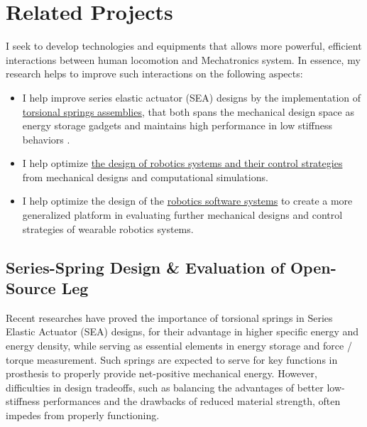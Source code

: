 \documentclass[8pt]{article}
\begin{document}

 

% 

\section{Related Projects}

I seek to develop technologies and equipments that allows more powerful, efficient interactions between human locomotion and Mechatronics system. In essence, my research helps to improve such interactions on the following aspects: 

\begin{itemize}

    \item {I help improve series elastic actuator (SEA) designs by the implementation of \hyperref[sec:series-spring]{torsional springs assemblies}, that both spans the mechanical design space as energy storage gadgets and maintains high performance in low stiffness behaviors \cite{SpringDesign_OSL}.}
    
    \item {I help optimize \hyperref[sec:RobotSwimmer]{the design of robotics systems and their control strategies} from mechanical designs and computational simulations.}
    
    \item {I help optimize the design of the \hyperref[sec:OSL-Library]{robotics software systems} to create a more generalized platform in evaluating further mechanical designs and control strategies of wearable robotics systems.}

\end{itemize}


    \subsection{Series-Spring Design \& Evaluation of Open-Source Leg}  \label{sec:series-spring}

    Recent researches have proved the importance of torsional springs in Series Elastic Actuator (SEA) designs, for their advantage in higher specific energy and energy density, while serving as essential elements in energy storage and force / torque measurement. Such springs are expected to serve for key functions in prosthesis to properly provide net-positive mechanical energy. However, difficulties in design tradeoffs, such as balancing the advantages of better low-stiffness performances and the drawbacks of reduced material strength, often impedes from properly functioning. 
\end{document}

